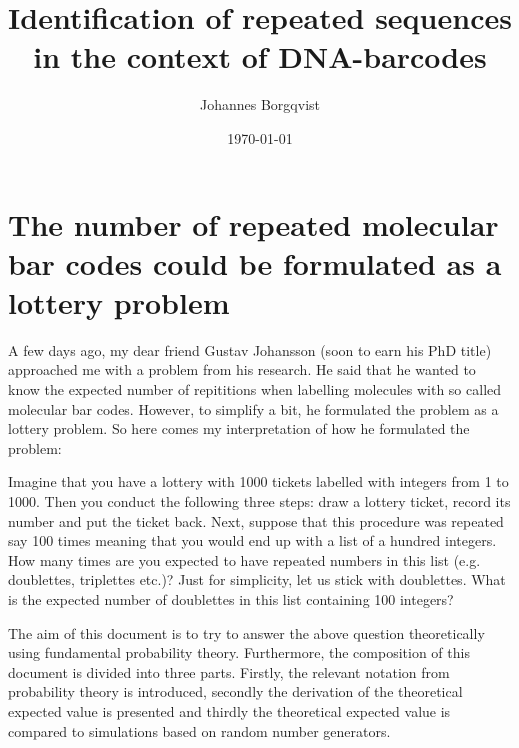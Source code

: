 \documentclass{article}
\begin{document}
\title{\textbf{Identification of repeated sequences in the context of DNA-barcodes}}
\author{Johannes Borgqvist}
\date{\today}
\maketitle
\tableofcontents
\listoffigures
\thispagestyle{empty}
\clearpage
\setcounter{page}{1}
\section{The number of repeated molecular bar codes could be formulated as a lottery problem}
A few days ago, my dear friend Gustav Johansson (soon to earn his PhD title) approached me with a problem from his research. He said that he wanted to know the expected number of
repititions when labelling molecules with so called molecular bar codes. However, to simplify a bit, he formulated
the problem as a lottery problem. So here comes my interpretation of how he formulated the problem:

\begin{center}
  \textsf{Imagine that you have a lottery with 1000 tickets labelled with integers from 1 to 1000. Then you conduct the following three steps: draw a lottery ticket, record its number and put the ticket back.
    Next, suppose that this procedure was repeated say 100 times meaning that you would end up with a list of a hundred integers. How many times are you expected to have repeated numbers in this list (e.g. doublettes, triplettes etc.)? Just for simplicity, let us stick with doublettes.
  What is the expected number of doublettes in this list containing 100 integers?}
  \end{center}

The aim of this document is to try to answer the above question theoretically using fundamental probability theory. Furthermore, the composition of this document is divided into three parts. Firstly, the relevant notation from probability theory is introduced, secondly the derivation of the theoretical expected value is presented and thirdly
the theoretical expected value is compared to simulations based on random number generators. 
\end{document}
